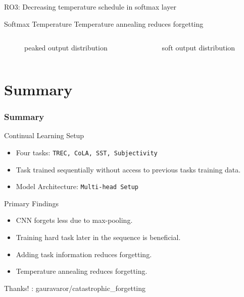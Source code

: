 \documentclass[aspectratio=169]{beamer}
\begin{document}
	\begin{frame}{RO3: Decreasing temperature schedule in softmax layer}
	    \begin{block}{Softmax Temperature}
		Temperature annealing reduces forgetting
	    \end{block}\pause
	    \begin{columns}
		\begin{column}{0.5\textwidth}
		\begin{figure}[h]
		    
		    \caption{peaked output distribution}
		\end{figure}
		\end{column}
		\begin{column}{0.5\textwidth}  %
		\begin{figure}[h]
		    
		    \caption{soft output distribution}
		\end{figure}
		\end{column}
		\end{columns}
	 \end{frame}
\section{Summary}
	\begin{frame}
	    \frametitle{Summary}
		\begin{block}{Continual Learning Setup}
		    \begin{itemize}
			\item Four tasks: \texttt{TREC, CoLA, SST, Subjectivity}
			\item Task trained sequentially without access to previous tasks training data.
			\item Model Architecture: \texttt{Multi-head Setup}
		    \end{itemize}
		\end{block}
		\begin{block}{Primary Findings}
		    \begin{itemize}
			\item CNN forgets less due to max-pooling.
			\item Training hard task later in the sequence is beneficial.
			\item Adding task information reduces forgetting.
			\item Temperature annealing reduces forgetting.
		    \end{itemize}
		\end{block} \pause
		   Thanks! \hfill \faGithub: gauravaror/catastrophic\_forgetting
	\end{frame}
\end{document}
